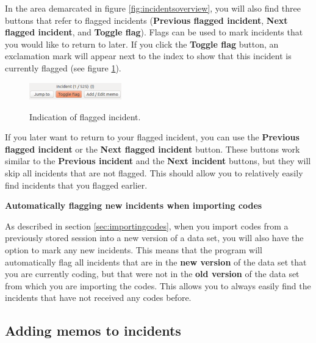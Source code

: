 \documentclass{memoir}
\begin{document}
In the area demarcated in figure \ref{fig:incidentsoverview}, you will also find three buttons that refer to flagged incidents (\textbf{Previous flagged incident}, \textbf{Next flagged incident}, and \textbf{Toggle flag}). Flags can be used to mark incidents that you would like to return to later. If you click the \textbf{Toggle flag} button, an exclamation mark will appear next to the index to show that this incident is currently flagged (see figure \ref{fig:flaggedincident}).

\begin{figure}[h!]
  \centering
  \caption{Indication of flagged incident.}
  \includegraphics[width=40mm]{Screenshot_5.pdf}
  \label{fig:flaggedincident}
\end{figure}

If you later want to return to your flagged incident, you can use the \textbf{Previous flagged incident} or the \textbf{Next flagged incident} button. These buttons work similar to the \textbf{Previous incident} and the \textbf{Next incident} buttons, but they will skip all incidents that are not flagged. This should allow you to relatively easily find incidents that you flagged earlier.

\begin{framed}
\textbf{Automatically flagging new incidents when importing codes}
  
  As described in section \ref{sec:importingcodes}, when you import codes from a previously stored session into a new version of a data set, you will also have the option to mark any new incidents. This means that the program will automatically flag all incidents that are in the \textbf{new version} of the data set that you are currently coding, but that were not in the \textbf{old version} of the data set from which you are importing the codes. This allows you to always easily find the incidents that have not received any codes before. 
\end{framed}

\subsection{Adding memos to incidents}
\label{sec:memosincidents}
\end{document}
